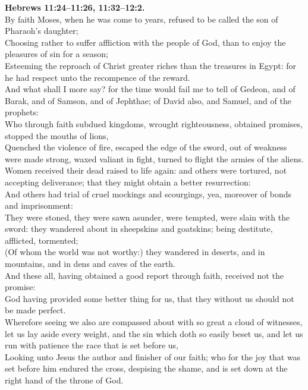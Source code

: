 \documentclass[10pt]{article} %
\begin{document}
{\begin{minipage}[t]{0.45\textwidth}
\textbf{Hebrews 11:24--11:26, 11:32--12:2.}\\
By faith Moses, when he was come to years, refused to be called the son of Pharaoh's daughter;\\
Choosing rather to suffer affliction with the people of God, than to enjoy the pleasures of sin for a season;\\
Esteeming the reproach of Christ greater riches than the treasures in Egypt: for he had respect unto the recompence of the reward.\\
And what shall I more say? for the time would fail me to tell of Gedeon, and of Barak, and of Samson, and of Jephthae; of David also, and Samuel, and of the prophets:\\
Who through faith subdued kingdoms, wrought righteousness, obtained promises, stopped the mouths of lions,\\
Quenched the violence of fire, escaped the edge of the sword, out of weakness were made strong, waxed valiant in fight, turned to flight the armies of the aliens.\\
Women received their dead raised to life again: and others were tortured, not accepting deliverance; that they might obtain a better resurrection:\\
And others had trial of cruel mockings and scourgings, yea, moreover of bonds and imprisonment:\\
They were stoned, they were sawn asunder, were tempted, were slain with the sword: they wandered about in sheepskins and goatskins; being destitute, afflicted, tormented;\\
(Of whom the world was not worthy:) they wandered in deserts, and in mountains, and in dens and caves of the earth.\\
And these all, having obtained a good report through faith, received not the promise:\\
God having provided some better thing for us, that they without us should not be made perfect.\\
Wherefore seeing we also are compassed about with so great a cloud of witnesses, let us lay aside every weight, and the sin which doth so easily beset us, and let us run with patience the race that is set before us,\\
Looking unto Jesus the author and finisher of our faith; who for the joy that was set before him endured the cross, despising the shame, and is set down at the right hand of the throne of God.\\

\end{minipage}}
\end{document}
